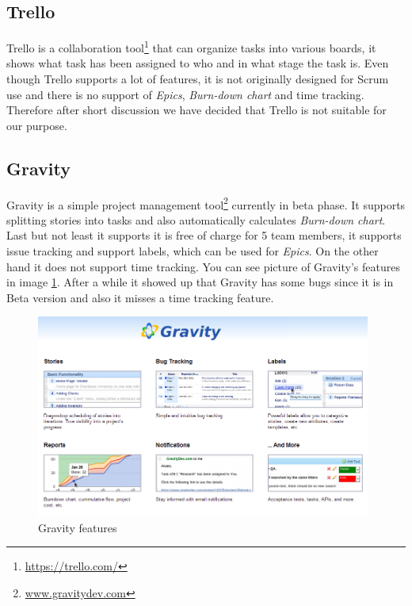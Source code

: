 
\subsection{Trello}
Trello is a collaboration tool\footnote{\url{https://trello.com/}} that can organize tasks into various boards, it shows what task has been assigned to who and in what stage the task is.
Even though Trello supports a lot of features, it is not originally designed for Scrum use and there is no support of \emph{Epics}, \emph{Burn-down chart} and time tracking. Therefore after short discussion we have decided that Trello is not suitable for our purpose.


\subsection{Gravity} 
Gravity is a simple project management tool\footnote{\url{www.gravitydev.com}} currently in beta phase.
It supports splitting stories into tasks and also automatically calculates \emph{Burn-down chart}. 
Last but not least it supports it is free of charge for 5 team members, it supports issue tracking and support labels, which can be used for \emph{Epics}.
On the other hand it does not support time tracking.
You can see picture of Gravity's features in image \ref{img:gravity}. After a while it showed up that Gravity has some bugs since it is in Beta version and also it misses a time tracking feature.

\begin{figure}[!h]
	\centering
		\includegraphics[width=11cm]{preliminaryStudies/gravity.png}
	\caption{Gravity features}
	\label{img:gravity}
\end{figure}

